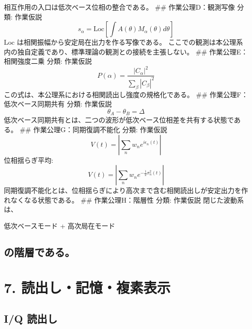 \documentclass[
  a4paper]{ltjsarticle}
\newenvironment{Shaded}{}{}
\newcommand{\NormalTok}[1]{#1}
\begin{document}
相互作用の入口は低次ベース位相の整合である。 \#\# 作業公理D：観測写像
分類: 作業仮説 \[
s_\alpha=\mathrm{Loc}\left[\int A(\theta)M_\alpha(\theta)d\theta\right]
\] \(\mathrm{Loc}\) は相関振幅から安定局在出力を作る写像である。
ここでの観測は本公理系内の独自定義であり、標準理論の観測との接続を主張しない。
\#\# 作業公理E：相関強度二乗 分類: 作業仮説 \[
P(\alpha)=\frac{|C_\alpha|^2}{\sum_\beta |C_\beta|^2}
\] この式は、本公理系における相関読出し強度の規格化である。 \#\#
作業公理F：低次ベース同期共有 分類: 作業仮説 \[
\theta_A-\theta_B=\Delta
\]
低次ベース同期共有とは、二つの波形が低次ベース位相差を共有する状態である。
\#\# 作業公理G：同期復調不能化 分類: 作業仮説 \[
V(t)=\left|\sum_n w_n e^{i\epsilon_n(t)}\right|
\] 位相揺らぎ平均: \[
V(t)=\left|\sum_n w_n e^{-\frac12\sigma_n^2(t)}\right|
\]
同期復調不能化とは、位相揺らぎにより高次まで含む相関読出しが安定出力を作れなくなる状態である。
\#\# 作業公理H：階層性 分類: 作業仮説 閉じた波動系は、

\begin{Shaded}
\begin{Highlighting}[]
\NormalTok{低次ベースモード}
\NormalTok{+ 高次局在モード}
\end{Highlighting}
\end{Shaded}

\subsection{の階層である。}\label{ux306eux968eux5c64ux3067ux3042ux308b}

\section{7.
読出し・記憶・複素表示}\label{ux8aadux51faux3057ux8a18ux61b6ux8907ux7d20ux8868ux793a}

\subsection{I/Q 読出し}\label{iq-ux8aadux51faux3057}
\end{document}
